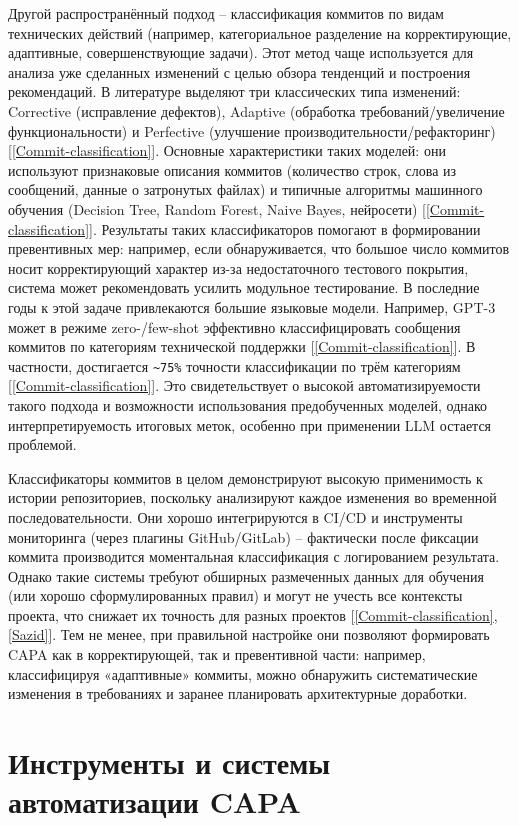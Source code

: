 Другой распространённый подход – классификация коммитов по видам технических действий (например, категориальное разделение на корректирующие, адаптивные, совершенствующие задачи). Этот метод чаще используется для анализа уже сделанных изменений с целью обзора тенденций и построения рекомендаций. В литературе выделяют три классических типа изменений: Corrective (исправление дефектов), Adaptive (обработка требований/увеличение функциональности) и Perfective (улучшение производительности/рефакторинг) [\ref{Commit-classification}]. Основные характеристики таких моделей: они используют признаковые описания коммитов (количество строк, слова из сообщений, данные о затронутых файлах) и типичные алгоритмы машинного обучения (Decision Tree, Random Forest, Naive Bayes, нейросети) [\ref{Commit-classification}]. Результаты таких классификаторов помогают в формировании превентивных мер: например, если обнаруживается, что большое число коммитов носит корректирующий характер из-за недостаточного тестового покрытия, система может рекомендовать усилить модульное тестирование. В последние годы к этой задаче привлекаются большие языковые модели. Например, GPT-3 может в режиме zero-/few-shot эффективно классифицировать сообщения коммитов по категориям технической поддержки [\ref{Commit-classification}]. В частности, достигается \verb|~75%| точности классификации  по трём категориям [\ref{Commit-classification}].
Это свидетельствует о высокой автоматизируемости такого подхода и возможности использования предобученных моделей, однако интерпретируемость итоговых меток, особенно при применении LLM остается проблемой.

Классификаторы коммитов в целом демонстрируют высокую применимость к истории репозиториев, поскольку анализируют каждое изменения во временной последовательности. Они хорошо интегрируются в CI/CD и инструменты мониторинга (через плагины GitHub/GitLab) – фактически после фиксации коммита производится моментальная классификация с логированием результата. Однако такие системы требуют обширных размеченных данных для обучения (или хорошо сформулированных правил) и могут не учесть все контексты проекта, что снижает их точность для разных проектов [\ref{Commit-classification}, \ref{Sazid}]. Тем не менее, при правильной настройке они позволяют формировать CAPA как в корректирующей, так и превентивной части: например, классифицируя «адаптивные» коммиты, можно обнаружить систематические изменения в требованиях и заранее планировать архитектурные доработки.

\section{Инструменты и системы автоматизации CAPA} \label{ch1:sec4}

